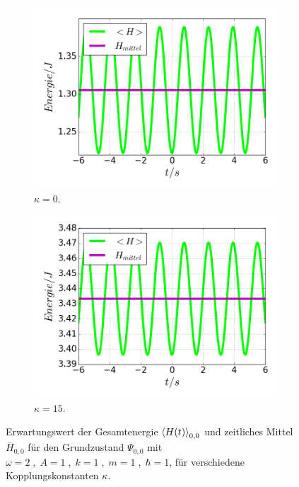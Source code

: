     \begin{figure}
      \begin{subfigure}[t]{0.5\textwidth}
        \centering
        \includegraphics[width=\textwidth]{plots/<H>00_kappa0.png}
        \caption{$\kappa=0$.}
        \label{fig:H_kappa0}
      \end{subfigure}
      \quad
      \begin{subfigure}[t]{0.5\textwidth}
          \centering
          \includegraphics[width=\textwidth]{plots/<H>00_kappa15.png}
          \caption{$\kappa=15$.}
          \label{fig:H_kappa15}
      \end{subfigure}
      \caption{Erwartungswert der Gesamtenergie $\braket{H(t)}_{0,0}$ und zeitliches Mittel $\overline{H}_{0,0}$ für den Grundzustand $\Psi_{0,0}$ mit $\omega=2 \;,\; A=1 \;,\; k=1 \;,\; m=1 \;,\; \hbar=1$, für verschiedene Kopplungskonstanten $\kappa$.}
    \end{figure}
